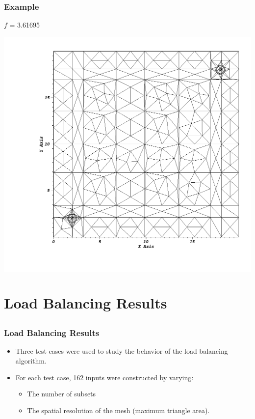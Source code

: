 \documentclass[]{beamer}
\begin{document}
\begin{frame}[t]\frametitle{Example}
\begin{minipage}{0.15\textwidth}
\begin{footnotesize}
$f$ = 3.61695
\end{footnotesize}
\end{minipage}
\begin{minipage}{0.8\textwidth}
\centering
\includegraphics[scale = 0.22]{figures/redistribute_after.png}
\end{minipage}
\end{frame}

\section{Load Balancing Results}
\subsection{}
\begin{frame}[t]\frametitle{Load Balancing Results}
\begin{block}{}
\begin{itemize}
	\item Three test cases were used to study the behavior of the load balancing algorithm.
	\item For each test case, 162 inputs were constructed by varying:
		\begin{itemize}
		\item The number of subsets
		\item The spatial resolution of the mesh (maximum triangle area).
		\end{itemize}
		
\end{itemize}
\end{block}
\end{frame}
\end{document}
